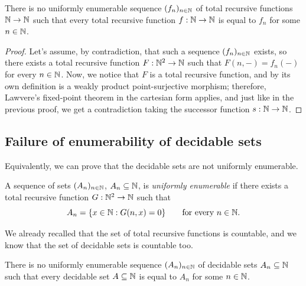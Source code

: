 \begin{theorem}
    There is no uniformly enumerable sequence $(f_n)_{n \in \mathbb{N}}$ of total recursive functions $\mathbb{N} \to \mathbb{N}$
    such that every total recursive function $f : \mathbb{N} \to \mathbb{N}$ is equal to $f_n$ for some $n \in \mathbb{N}$.
\end{theorem}

\begin{proof}
    Let's assume, by contradiction, that such a sequence $(f_n)_{n \in \mathbb{N}}$ exists, so there exists a total recursive function $F : \mathbb{N}^2 \to \mathbb{N}$ such that $F(n,-) = f_n(-)$ for every $n \in \mathbb{N}$.
    Now, we notice that $F$ is a total recursive function, and by its own definition is a weakly product point-surjective morphism; therefore, Lawvere's fixed-point theorem in the cartesian form applies,
    and just like in the previous proof, we get a contradiction taking the successor function $s : \mathbb{N} \to \mathbb{N}$.
\end{proof}

\subsection*{Failure of enumerability of decidable sets}
Equivalently, we can prove that the decidable sets are not uniformly enumerable.

\begin{definition}
    A sequence of sets $(A_n)_{n \in \mathbb{N}}$, $A_n \subseteq \mathbb{N}$, is \emph{uniformly enumerable} if there exists a total recursive function $G : \mathbb{N}^2 \to \mathbb{N}$ such that
    \[ A_n = \{x \in \mathbb{N} : G(n,x) = 0\} \qquad \text{for every $n \in \mathbb{N}$}. \]
\end{definition}

\begin{remark}
    We already recalled that the set of total recursive functions is countable, and we know that the set of decidable sets is countable too.
\end{remark}

\begin{theorem}
    There is no uniformly enumerable sequence $(A_n)_{n \in \mathbb{N}}$ of decidable sets $A_n \subseteq \mathbb{N}$ such that every decidable set $A \subseteq \mathbb{N}$ is equal to $A_n$ for some $n \in \mathbb{N}$.
\end{theorem}

